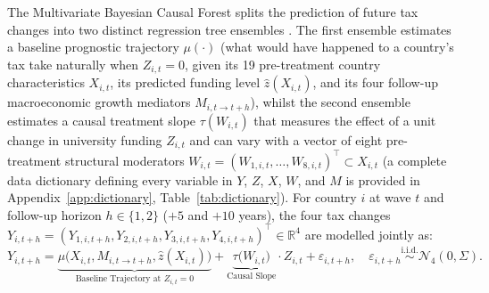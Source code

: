 \documentclass[11pt,a4paper]{article}
\begin{document}
The Multivariate Bayesian Causal Forest \citep{hahn2020bayesian, mcjames2024mvbcf} splits the prediction of future tax changes into two distinct regression tree ensembles \citep{chipman2010bart}. The first ensemble estimates a baseline prognostic trajectory $\mu(\cdot)$ (what would have happened to a country's tax take naturally when $Z_{i,t} = 0$, given its 19 pre-treatment country characteristics $X_{i,t}$, its predicted funding level $\hat{z}(X_{i,t})$, and its four follow-up macroeconomic growth mediators $M_{i,t\to t+h}$), whilst the second ensemble estimates a causal treatment slope $\tau(W_{i,t})$ that measures the effect of a unit change in university funding $Z_{i,t}$ and can vary with a vector of eight pre-treatment structural moderators $W_{i,t} = (W_{1,i,t}, \dots, W_{8,i,t})^\top \subset X_{i,t}$ (a complete data dictionary defining every variable in $Y$, $Z$, $X$, $W$, and $M$ is provided in Appendix~\ref{app:dictionary}, Table~\ref{tab:dictionary}). For country $i$ at wave $t$ and follow-up horizon $h \in \{1, 2\}$ ($+5$ and $+10$ years), the four tax changes $Y_{i, t+h} = (Y_{1,i,t+h}, Y_{2,i,t+h}, Y_{3,i,t+h}, Y_{4,i,t+h})^\top \in \mathbb{R}^4$ are modelled jointly as:
\begin{equation}
  Y_{i, t+h} = \underbrace{\mu\bigl(X_{i,t}, M_{i,t\to t+h}, \hat{z}(X_{i,t})\bigr)}_{\text{Baseline Trajectory at } Z_{i,t}=0} + \underbrace{\tau\bigl(W_{i,t}\bigr)}_{\text{Causal Slope}} \cdot Z_{i,t} + \varepsilon_{i, t+h}, \quad \varepsilon_{i, t+h} \stackrel{\text{i.i.d.}}{\sim} \mathcal{N}_4(0, \Sigma).
  \label{eq:mvbcf}
\end{equation}
\end{document}
